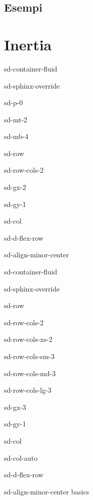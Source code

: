 \documentclass[letterpaper,10pt,english]{jupyterBook}
\begin{document}
\section{Esempi}
\label{\detokenize{ch/actions-examples:esempi}}\label{\detokenize{ch/actions-examples:classical-mechanics-actions-examples}}\label{\detokenize{ch/actions-examples::doc}}
\sphinxstepscope


\chapter{Inertia}
\label{\detokenize{ch/inertia:inertia}}\label{\detokenize{ch/inertia:classical-mechanics-inertia}}\label{\detokenize{ch/inertia::doc}}
\sphinxstepscope

\begin{sphinxuseclass}{sd-container-fluid}
\begin{sphinxuseclass}{sd-sphinx-override}
\begin{sphinxuseclass}{sd-p-0}
\begin{sphinxuseclass}{sd-mt-2}
\begin{sphinxuseclass}{sd-mb-4}
\begin{sphinxuseclass}{sd-row}
\begin{sphinxuseclass}{sd-row-cols-2}
\begin{sphinxuseclass}{sd-gx-2}
\begin{sphinxuseclass}{sd-gy-1}
\begin{sphinxuseclass}{sd-col}
\begin{sphinxuseclass}{sd-d-flex-row}
\begin{sphinxuseclass}{sd-align-minor-center}
\begin{sphinxuseclass}{sd-container-fluid}
\begin{sphinxuseclass}{sd-sphinx-override}
\begin{sphinxuseclass}{sd-row}
\begin{sphinxuseclass}{sd-row-cols-2}
\begin{sphinxuseclass}{sd-row-cols-xs-2}
\begin{sphinxuseclass}{sd-row-cols-sm-3}
\begin{sphinxuseclass}{sd-row-cols-md-3}
\begin{sphinxuseclass}{sd-row-cols-lg-3}
\begin{sphinxuseclass}{sd-gx-3}
\begin{sphinxuseclass}{sd-gy-1}
\begin{sphinxuseclass}{sd-col}
\begin{sphinxuseclass}{sd-col-auto}
\begin{sphinxuseclass}{sd-d-flex-row}
\begin{sphinxuseclass}{sd-align-minor-center}
\sphinxAtStartPar
basics


\end{sphinxuseclass}
\end{sphinxuseclass}
\end{sphinxuseclass}
\end{sphinxuseclass}
\end{sphinxuseclass}
\end{sphinxuseclass}
\end{sphinxuseclass}
\end{sphinxuseclass}
\end{sphinxuseclass}
\end{sphinxuseclass}
\end{sphinxuseclass}
\end{sphinxuseclass}
\end{sphinxuseclass}
\end{sphinxuseclass}
\end{sphinxuseclass}
\end{sphinxuseclass}
\end{sphinxuseclass}
\end{sphinxuseclass}
\end{sphinxuseclass}
\end{sphinxuseclass}
\end{sphinxuseclass}
\end{sphinxuseclass}
\end{sphinxuseclass}
\end{sphinxuseclass}
\end{sphinxuseclass}
\end{sphinxuseclass}
\end{document}
